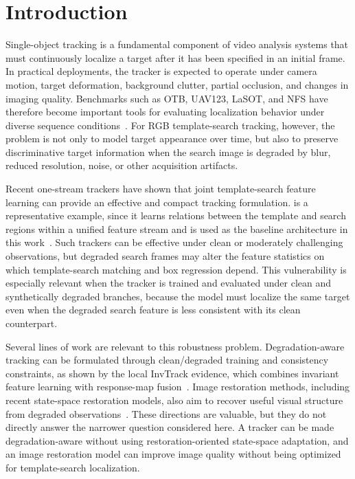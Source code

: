 \section{Introduction}

Single-object tracking is a fundamental component of video analysis systems that must continuously localize a target after it has been specified in an initial frame. In practical deployments, the tracker is expected to operate under camera motion, target deformation, background clutter, partial occlusion, and changes in imaging quality. Benchmarks such as OTB, UAV123, LaSOT, and NFS have therefore become important tools for evaluating localization behavior under diverse sequence conditions~\cite{wu2013otb,mueller2016uav123,fan2019lasot,galoogahi2017nfs}. For RGB template-search tracking, however, the problem is not only to model target appearance over time, but also to preserve discriminative target information when the search image is degraded by blur, reduced resolution, noise, or other acquisition artifacts.

Recent one-stream trackers have shown that joint template-search feature learning can provide an effective and compact tracking formulation. \baseline{} is a representative example, since it learns relations between the template and search regions within a unified feature stream and is used as the baseline architecture in this work~\cite{ye2022ostrack}. Such trackers can be effective under clean or moderately challenging observations, but degraded search frames may alter the feature statistics on which template-search matching and box regression depend. This vulnerability is especially relevant when the tracker is trained and evaluated under clean and synthetically degraded branches, because the model must localize the same target even when the degraded search feature is less consistent with its clean counterpart.

Several lines of work are relevant to this robustness problem. Degradation-aware tracking can be formulated through clean/degraded training and consistency constraints, as shown by the local InvTrack evidence, which combines invariant feature learning with response-map fusion~\cite{invtrack_local}. Image restoration methods, including recent state-space restoration models, also aim to recover useful visual structure from degraded observations~\cite{guo2024mambair,guo2025mambairv2}. These directions are valuable, but they do not directly answer the narrower question considered here. A tracker can be made degradation-aware without using restoration-oriented state-space adaptation, and an image restoration model can improve image quality without being optimized for template-search localization.

